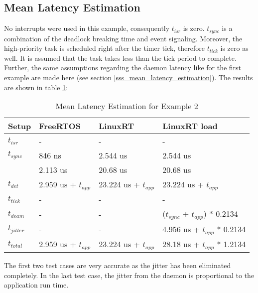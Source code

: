 \subsection{Mean Latency Estimation}\label{sss_mean_latency_estimation2}
No interrupts were used in this example, consequently $t_{isr}$ is zero.
$t_{sync}$ is a combination of the deadlock breaking time and event signaling. 
Moreover, the high-priority task is scheduled right after the timer tick, therefore $t_{tick}$ is zero as well.
It is assumed that the task takes less than the tick period to complete. 
Further, the same assumptions regarding the daemon latency like for the first example are made here (see section \ref{sss_mean_latency_estimation}).
The results are shown in table \ref{tab_example2_mean}:
\begin{table}[htbp]
	\centering
		\begin{tabular}{|l|l|l|l|}
			\hline
				Setup					& FreeRTOS 								& LinuxRT 							& LinuxRT load  \\
				\hline 
			 	$t_{isr}$ 		& -				 								& -											& -							\\
			  $t_{sync}$		& 846 ns			  	  			& 2.544 us 				 			& 2.544 us			\\
			  							&	2.113 us								& 20.68 us							& 20.68 us			\\
			  \hline 
			  $t_{det}$			& 2.959 us + $t_{app}$		& 23.224 us + $t_{app}$	& 23.224 us	+ $t_{app}$		\\ 
			  \hline
			  \hline
			  $t_{tick}$		& -												& -					 					  & -													\\
			  $t_{deam}$		& -				  							& - 				 						& ($t_{sync}$ + $t_{app}$) * 0.2134 \\ 
				\hline 
			  $t_{jitter}$	& -				  							& -										  & 4.956 us	+ $t_{app}$ * 0.2134 \\ 
			  \hline
			  \hline 
			  $t_{total}$		& 2.959 us + $t_{app}$	 & 23.224 us + $t_{app}$  &	28.18 us + $t_{app}$ * 1.2134 	\\ 
			\hline
		\end{tabular}
	\caption{Mean Latency Estimation for Example 2}
	\label{tab_example2_mean}
\end{table}
The first two test cases are very accurate as the jitter has been eliminated completely.
In the last test case, the jitter from the daemon is proportional to the application run time.

